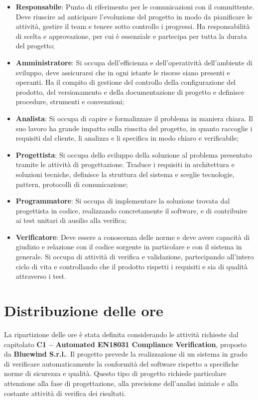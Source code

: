 \documentclass[a4paper,12pt]{article}
\begin{document}
        \begin{itemize}
            \item \textbf{Responsabile}: Punto di riferimento per le comunicazioni con il committente. Deve riuscire ad anticipare l'evoluzione del progetto in modo da pianificare le attività, gestire il team e tenere sotto controllo i progressi. Ha responsabilità di scelta e approvazione, per cui è essenziale e partecipa per tutta la durata del progetto;
            \item \textbf{Amministratore}: Si occupa dell'efficienza e dell'operatività dell'ambiente di sviluppo, deve assicurarsi che in ogni istante le risorse siano presenti e operanti. Ha il compito di gestione del controllo della configurazione del prodotto, del versionamento e della documentazione di progetto e definisce procedure, strumenti e convenzioni;
            \item \textbf{Analista}: Si occupa di capire e formalizzare il problema in maniera chiara. Il suo lavoro ha grande impatto sulla riuscita del progetto, in quanto raccoglie i requisiti dal cliente, li analizza e li specifica in modo chiaro e verificabile;
            \item \textbf{Progettista}: Si occupa dello sviluppo della soluzione al problema presentato tramite le attività di progettazione. Traduce i requisiti in architettura e soluzioni tecniche, definisce la struttura del sistema e sceglie tecnologie, pattern, protocolli di comunicazione;
            \item \textbf{Programmatore}: Si occupa di implementare la soluzione trovata dal progettista in codice, realizzando concretamente il software, e di contribuire ai test unitari di ausilio alla verifica;
            \item \textbf{Verificatore}: Deve essere a conoscenza delle norme e deve avere capacità di giudizio e relazione con il codice sorgente in particolare e con il sistema in generale. Si occupa di attività di verifica e validazione, partecipando all'intero ciclo di vita e controllando che il prodotto rispetti i requisiti e sia di qualità attraverso i test.
        \end{itemize}

\section{Distribuzione delle ore}
La ripartizione delle ore è stata definita considerando le attività richieste dal capitolato \textbf{C1 – Automated EN18031 Compliance Verification}, proposto da \textbf{Bluewind S.r.l.}.  
Il progetto prevede la realizzazione di un sistema in grado di verificare automaticamente la conformità del software rispetto a specifiche norme di sicurezza e qualità. Questo tipo di progetto richiede particolare attenzione alla fase di progettazione, alla precisione dell’analisi iniziale e alla costante attività di verifica dei risultati.
\end{document}
